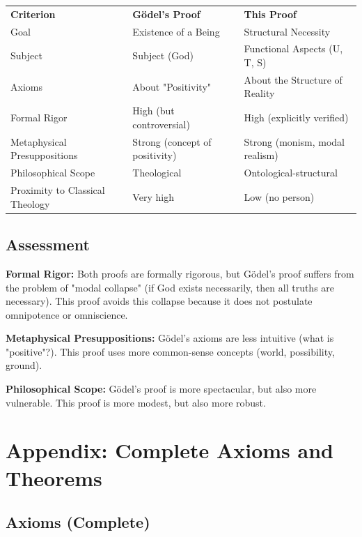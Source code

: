 \documentclass[
]{article}
\begin{document}
\begin{tabular}{lll}
\textbf{Criterion} & \textbf{Gödel's Proof} & \textbf{This Proof} \\
Goal & Existence of a Being & Structural Necessity \\
Subject & Subject (God) & Functional Aspects (U, T, S) \\
Axioms & About "Positivity" & About the Structure of Reality \\
Formal Rigor & High (but controversial) & High (explicitly verified) \\
Metaphysical Presuppositions & Strong (concept of positivity) & Strong (monism, modal realism) \\
Philosophical Scope & Theological & Ontological-structural \\
Proximity to Classical Theology & Very high & Low (no person) \\
\end{tabular}

\subsection{Assessment}\label{assessment}

\textbf{Formal Rigor:} Both proofs are formally rigorous, but Gödel's proof suffers from the problem of "modal collapse" (if God exists necessarily, then all truths are necessary). This proof avoids this collapse because it does not postulate omnipotence or omniscience.

\textbf{Metaphysical Presuppositions:} Gödel's axioms are less intuitive (what is "positive"?). This proof uses more common-sense concepts (world, possibility, ground).

\textbf{Philosophical Scope:} Gödel's proof is more spectacular, but also more vulnerable. This proof is more modest, but also more robust.

\section{Appendix: Complete Axioms and Theorems}\label{appendix-complete-axioms-and-theorems}

\subsection{Axioms (Complete)}\label{axioms-complete}
\end{document}
